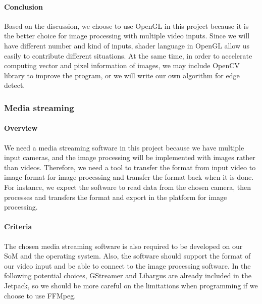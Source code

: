 \paragraph{Conclusion}
Based on the discussion, we choose to use OpenGL in this project because it is the better choice for 
image processing with multiple video inputs. Since we will have different number and kind of inputs, 
shader language in OpenGL allow us easily to contribute different situations. At the same time, in order 
to accelerate computing vector and pixel information of images, we may include OpenCV library to improve 
the program, or we will write our own algorithm for edge detect. \\


\subsubsection{Media streaming}
\paragraph{Overview}
We need a media streaming software in this project because we have multiple input cameras, and the image 
processing will be implemented with images rather than videos. Therefore, we need a tool to transfer the 
format from input video to image format for image processing and transfer the format back when it is done. 
For instance, we expect the software to read data from the chosen camera, then processes and transfers 
the format and export in the platform for image processing.\\

\paragraph{Criteria}
The chosen media streaming software is also required to be developed on our SoM and the operating 
system. Also, the software should support the format of our video input and be able to connect to 
the image processing software. In the following potential choices, GStreamer and Libargus are 
already included in the Jetpack, so we should be more careful on the limitations when programming 
if we choose to use FFMpeg. \\

